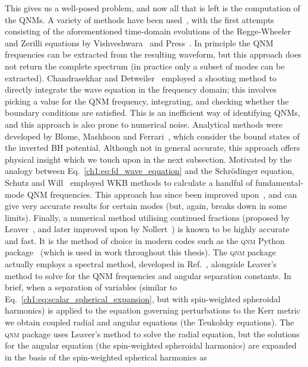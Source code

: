 This gives us a well-posed problem, and now all that is left is the computation of the QNMs. 
A variety of methods have been used~\cite{Kokkotas:1999bd, Berti:2004md}, with the first attempts consisting of the aforementioned time-domain evolutions of the Regge-Wheeler and Zerilli equations by Vishveshwara~\cite{Vishveshwara:1970zz} and Press~\cite{Press:1971wr}. 
In principle the QNM frequencies can be extracted from the resulting waveform, but this approach does not return the complete spectrum (in practice only a subset of modes can be extracted).
Chandrasekhar and Detweiler~\cite{Chandrasekhar:1975zza} employed a shooting method to directly integrate the wave equation in the frequency domain; this involves picking a value for the QNM frequency, integrating, and checking whether the boundary conditions are satisfied. 
This is an inefficient way of identifying QNMs, and this approach is also prone to numerical noise.
Analytical methods were developed by Blome, Mashhoon and Ferrari~\cite{BLOME1984231, Ferrari:1984ozr, Ferrari:1984zz}, which consider the bound states of the inverted BH potential. 
Although not in general accurate, this approach offers physical insight which we touch upon in the next subsection.
Motivated by the analogy between Eq.~\ref{ch1:eq:fd_wave_equation} and the Schr\"{o}dinger equation, Schutz and Will~\cite{Schutz:1985km} employed WKB methods to calculate a handful of fundamental-mode QNM frequencies.
This approach has since been improved upon~\cite{Iyer:1986np, Matyjasek:2017psv, Konoplya:2019hlu}, and can give very accurate results for certain modes (but, again, breaks down in some limits). 
Finally, a numerical method utilising continued fractions (proposed by Leaver~\cite{Leaver:1985ax}, and later improved upon by Nollert~\cite{Nollert:1993zz}) is known to be highly accurate and fast.
It is the method of choice in modern codes such as the \textsc{qnm} Python package~\cite{Stein:2019mop} (which is used in work throughout this thesis).
The \textsc{qnm} package actually employs a spectral method, developed in Ref.~\cite{Cook:2014cta}, alongside Leaver's method to solve for the QNM frequencies and angular separation constants. 
In brief, when a separation of variables (similar to Eq.~\ref{ch1:eq:scalar_spherical_expansion}, but with spin-weighted spheroidal harmonics) is applied to the equation governing perturbations to the Kerr metric we obtain coupled radial and angular equations (the Teukolsky equations). 
The \textsc{qnm} package uses Leaver's method to solve the radial equation, but the solutions for the angular equation (the spin-weighted spheroidal harmonics) are expanded in the basis of the spin-weighted spherical harmonics as
